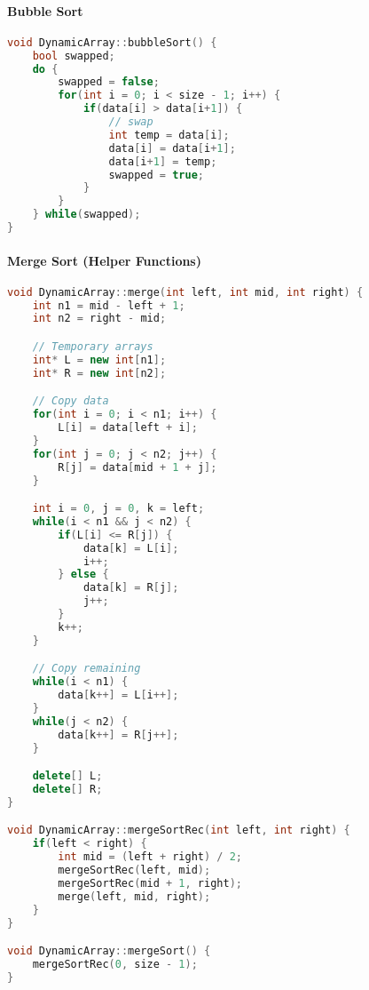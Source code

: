 \documentclass[a4paper,12pt]{article}
\begin{document}
\paragraph{Bubble Sort}
\begin{lstlisting}[language=C++]
void DynamicArray::bubbleSort() {
    bool swapped;
    do {
        swapped = false;
        for(int i = 0; i < size - 1; i++) {
            if(data[i] > data[i+1]) {
                // swap
                int temp = data[i];
                data[i] = data[i+1];
                data[i+1] = temp;
                swapped = true;
            }
        }
    } while(swapped);
}
\end{lstlisting}

\paragraph{Merge Sort (Helper Functions)}
\begin{lstlisting}[language=C++]
void DynamicArray::merge(int left, int mid, int right) {
    int n1 = mid - left + 1;
    int n2 = right - mid;

    // Temporary arrays
    int* L = new int[n1];
    int* R = new int[n2];

    // Copy data
    for(int i = 0; i < n1; i++) {
        L[i] = data[left + i];
    }
    for(int j = 0; j < n2; j++) {
        R[j] = data[mid + 1 + j];
    }

    int i = 0, j = 0, k = left;
    while(i < n1 && j < n2) {
        if(L[i] <= R[j]) {
            data[k] = L[i];
            i++;
        } else {
            data[k] = R[j];
            j++;
        }
        k++;
    }

    // Copy remaining
    while(i < n1) {
        data[k++] = L[i++];
    }
    while(j < n2) {
        data[k++] = R[j++];
    }

    delete[] L;
    delete[] R;
}

void DynamicArray::mergeSortRec(int left, int right) {
    if(left < right) {
        int mid = (left + right) / 2;
        mergeSortRec(left, mid);
        mergeSortRec(mid + 1, right);
        merge(left, mid, right);
    }
}

void DynamicArray::mergeSort() {
    mergeSortRec(0, size - 1);
}
\end{lstlisting}
\end{document}

